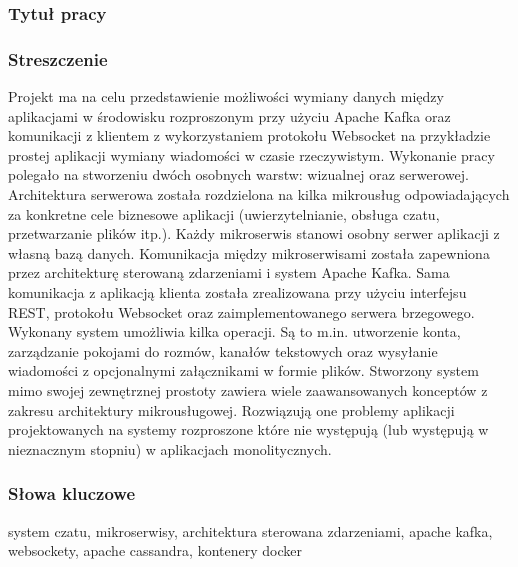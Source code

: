 \subsubsection*{Tytuł pracy}
\Title

\subsubsection*{Streszczenie}
Projekt ma na celu przedstawienie możliwości wymiany danych między aplikacjami w środowisku rozproszonym przy użyciu
Apache Kafka oraz komunikacji z klientem z wykorzystaniem protokołu Websocket na przykładzie prostej aplikacji wymiany
wiadomości w czasie rzeczywistym. Wykonanie pracy polegało na stworzeniu dwóch osobnych warstw: wizualnej oraz
serwerowej. Architektura serwerowa została rozdzielona na kilka mikrousług odpowiadających za konkretne cele biznesowe
aplikacji (uwierzytelnianie, obsługa czatu, przetwarzanie plików itp.). Każdy mikroserwis stanowi osobny serwer
aplikacji z własną bazą danych. Komunikacja między mikroserwisami została zapewniona przez architekturę sterowaną
zdarzeniami i system Apache Kafka. Sama komunikacja z aplikacją klienta została zrealizowana przy użyciu interfejsu
REST, protokołu Websocket oraz zaimplementowanego serwera brzegowego. Wykonany system umożliwia kilka operacji. Są to
m.in. utworzenie konta, zarządzanie pokojami do rozmów, kanałów tekstowych oraz wysyłanie wiadomości z opcjonalnymi
załącznikami w formie plików. Stworzony system mimo swojej zewnętrznej prostoty zawiera wiele zaawansowanych konceptów z
zakresu architektury mikrousługowej. Rozwiązują one problemy aplikacji projektowanych na systemy rozproszone które nie
występują (lub występują w nieznacznym stopniu) w aplikacjach monolitycznych.

\subsubsection*{Słowa kluczowe}
system czatu, mikroserwisy, architektura sterowana zdarzeniami, apache kafka, websockety, apache cassandra, kontenery
docker

\newpage


